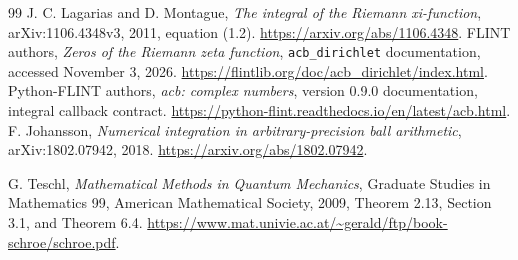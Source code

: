\documentclass[11pt,a4paper]{article}
\numberwithin{equation}{section}
\theoremstyle{definition}\newtheorem{definition}[theorem]{Definition}
\theoremstyle{remark}\newtheorem{remark}[theorem]{Remark}
\begin{document}
\begin{thebibliography}{99}
 J. C. Lagarias and D. Montague,
\emph{The integral of the Riemann xi-function}, arXiv:1106.4348v3, 2011,
equation (1.2). \url{https://arxiv.org/abs/1106.4348}.
 FLINT authors, \emph{Zeros of the Riemann zeta function},
\texttt{acb\_dirichlet} documentation, accessed November 3, 2026.
\url{https://flintlib.org/doc/acb_dirichlet/index.html}.
 Python-FLINT authors, \emph{acb: complex numbers},
version 0.9.0 documentation, integral callback contract.
\url{https://python-flint.readthedocs.io/en/latest/acb.html}.
 F. Johansson, \emph{Numerical integration in
arbitrary-precision ball arithmetic}, arXiv:1802.07942, 2018.
\url{https://arxiv.org/abs/1802.07942}.

G. Teschl, \emph{Mathematical Methods in Quantum Mechanics},
Graduate Studies in Mathematics 99, American Mathematical Society, 2009,
Theorem 2.13, Section 3.1, and Theorem 6.4.
\url{https://www.mat.univie.ac.at/~gerald/ftp/book-schroe/schroe.pdf}.

\end{thebibliography}
\end{document}
